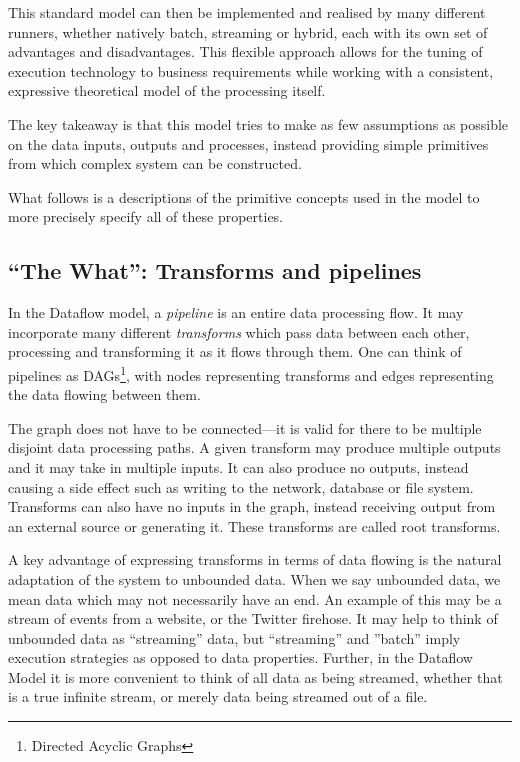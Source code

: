 This standard model can then be implemented and realised by many different runners, whether natively batch, streaming or hybrid, each with its own set of advantages and disadvantages. 
This flexible approach allows for the tuning of execution technology to business requirements while working with a consistent, expressive theoretical model of the processing itself.

The key takeaway is that this model tries to make as few assumptions as possible on the data inputs, outputs and processes, instead providing simple primitives from which complex system can be constructed.

What follows is a descriptions of the primitive concepts used in the model to more precisely specify all of these properties.

\subsection{``The What'': Transforms and pipelines}\label{sec:prep:dataflow:what}

In the Dataflow model, a \emph{pipeline} is an entire data processing flow.
It may incorporate many different \emph{transforms} which pass data between each other, processing and transforming it as it flows through them.
One can think of pipelines as DAGs\footnote{Directed Acyclic Graphs}, with nodes representing transforms and edges representing the data flowing between them.


The graph does not have to be connected---it is valid for there to be multiple disjoint data processing paths.
A given transform may produce multiple outputs and it may take in multiple inputs.
It can also produce no outputs, instead causing a side effect such as writing to the network, database or file system.
Transforms can also have no inputs in the graph, instead receiving output from an external source or generating it.
These transforms are called root transforms.

A key advantage of expressing transforms in terms of data flowing is the natural adaptation of the system to unbounded data.
When we say unbounded data, we mean data which may not necessarily have an end.
An example of this may be a stream of events from a website, or the Twitter firehose.
It may help to think of unbounded data as ``streaming'' data, but ``streaming'' and ''batch'' imply execution strategies as opposed to data properties.
Further, in the Dataflow Model it is more convenient to think of all data as being streamed, whether that is a true infinite stream, or merely data being streamed out of a file.

